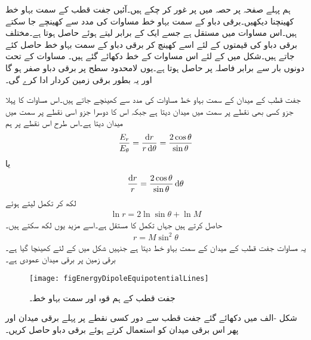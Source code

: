 ہم پہلے صفحہ  پر حصہ  میں  پر غور کر  چکے ہیں۔آئیں جفت قطب کے سمت بہاو خط کھینچنا دیکھیں۔برقی دباو کے سمت بہاو خط مساوات  کی مدد سے کھینچے جا سکتے ہیں۔اس مساوات میں  مستقل ہے جسے ایک کے برابر لیتے ہوئے   حاصل ہوتا ہے۔مختلف برقی دباو کی قیمتوں کے لئے اسے کھینچ کر برقی دباو کے سمت بہاو خط حاصل کئے جاتے ہیں۔شکل  میں  کے لئے اس مساوات کے خط دکھائے گئے ہیں۔ مساوات  کے تحت دونوں بار سے برابر فاصلہ پر  حاصل ہوتا ہے۔یوں  لامحدود سطح پر برقی دباو صفر ہو گا اور یہ بطور برقی زمین کردار ادا کرے گی۔ 

جفت قطب کے میدان کے سمت بہاو خط مساوات  کی مدد سے کھینچے جاتے ہیں۔اس مساوات کا پہلا جزو کسی بھی نقطے پر  سمت میں میدان  دیتا ہے جبکہ اس کا دوسرا جزو اسی نقطے پر  سمت میں میدان  دیتا ہے۔اس طرح اس نقطے پر ہم
\begin{align*}
\frac{E_r}{E_\theta}=\frac{\dif r}{r \dif \theta} =\frac{2 \cos \theta}{\sin \theta}
\end{align*}
یا
\begin{align*}
\frac{\dif r}{r } =\frac{2 \cos \theta}{\sin \theta}\dif \theta
\end{align*}
لکھ کر تکمل لیتے ہوئے
\begin{align*}
\ln r =2 \ln \sin \theta +\ln M
\end{align*}
حاصل کرتے ہیں جہاں  تکمل کا مستقل ہے۔اسے مزید یوں لکھ سکتے ہیں۔
\begin{align}
r=M \sin^2 \theta
\end{align}
یہ مساوات جفت قطب کے میدان کے سمت بہاو خط دیتا ہے جنہیں شکل  میں  کے لئے کھینچا گیا ہے۔برقی زمین پر برقی میدان عمودی ہے۔
\begin{figure}
\centering
\texttt{[image: figEnergyDipoleEquipotentialLines]}
\caption{جفت قطب کے ہم قوہ اور سمت بہاو خط۔}
\label{شکل_توانائی_جفت_قطب_ہم_قوہ_اور_سمت_بہاو_خط}
\end{figure}

شکل -الف میں دکھائے گئے جفت قطب سے دور کسی نقطے  پر پہلے برقی میدان اور پھر اس برقی میدان کو استعمال کرتے ہوئے برقی دباو حاصل کریں۔

